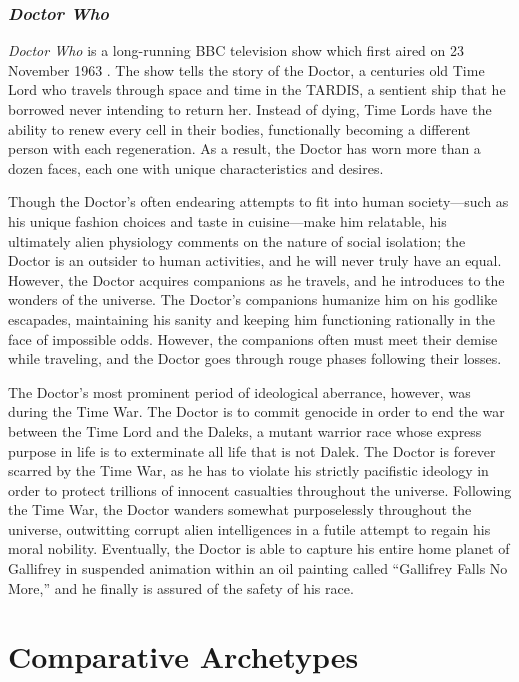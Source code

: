 \documentclass[10pt,a4paper]{article}
\begin{document}
\subsubsection{\emph{Doctor Who}}

\emph{Doctor Who} is a long-running BBC television show which first aired on 23 November 1963 \cite{mcdonough2013}. The show tells the story of the Doctor, a centuries old Time Lord who travels through space and time in the TARDIS, a sentient ship that he borrowed never intending to return her. Instead of dying, Time Lords have the ability to renew every cell in their bodies, functionally becoming a different person with each regeneration. As a result, the Doctor has worn more than a dozen faces, each one with unique characteristics and desires.  

Though the Doctor’s often endearing attempts to fit into human society—such as his unique fashion choices and taste in cuisine—make him relatable, his ultimately alien physiology comments on the nature of social isolation; the Doctor is an outsider to human activities, and he will never truly have an equal. However, the Doctor acquires companions as he travels, and he introduces to the wonders of the universe. The Doctor’s companions humanize him on his godlike escapades, maintaining his sanity and keeping him functioning rationally in the face of impossible odds. However, the companions often must meet their demise while traveling, and the Doctor goes through rouge phases following their losses.

The Doctor’s most prominent period of ideological aberrance, however, was during the Time War. The Doctor is to commit genocide in order to end the war between the Time Lord and the Daleks, a mutant warrior race whose express purpose in life is to exterminate all life that is not Dalek. The Doctor is forever scarred by the Time War, as he has to violate his strictly pacifistic ideology in order to protect trillions of innocent casualties throughout the universe. Following the Time War, the Doctor wanders somewhat purposelessly throughout the universe, outwitting corrupt alien intelligences in a futile attempt to regain his moral nobility. Eventually, the Doctor is able to capture his entire home planet of Gallifrey in suspended animation within an oil painting called “Gallifrey Falls No More,” and he finally is assured of the safety of his race.

\section{Comparative Archetypes}
\end{document}
